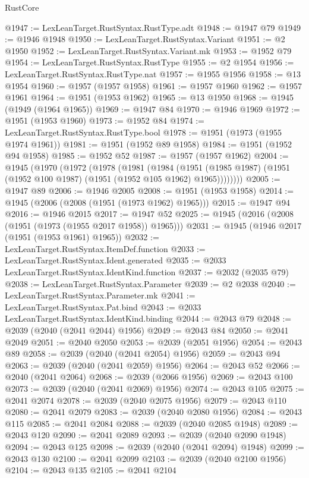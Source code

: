 \begin{lexlean}{RustCore}
\begin{coremodule}
@1947 := LexLeanTarget.RustSyntax.RustType.adt
@1948 := @1947 @79
@1949 := @1946 @1948
@1950 := LexLeanTarget.RustSyntax.Variant
@1951 := @2 @1950
@1952 := LexLeanTarget.RustSyntax.Variant.mk
@1953 := @1952 @79
@1954 := LexLeanTarget.RustSyntax.RustType
@1955 := @2 @1954
@1956 := LexLeanTarget.RustSyntax.RustType.nat
@1957 := @1955 @1956
@1958 := @13 @1954
@1960 := @1957 (@1957 @1958)
@1961 := @1957 @1960
@1962 := @1957 @1961
@1964 := @1951 (@1953 @1962)
@1965 := @13 @1950
@1968 := @1945 (@1949 (@1964 @1965))
@1969 := @1947 @84
@1970 := @1946 @1969
@1972 := @1951 (@1953 @1960)
@1973 := @1952 @84
@1974 := LexLeanTarget.RustSyntax.RustType.bool
@1978 := @1951 (@1973 (@1955 @1974 @1961))
@1981 := @1951 (@1952 @89 @1958)
@1984 := @1951 (@1952 @94 @1958)
@1985 := @1952 @52
@1987 := @1957 (@1957 @1962)
@2004 := @1945
    (@1970
      (@1972
        (@1978
          (@1981
            (@1984
              (@1951 (@1985 @1987) (@1951 (@1952 @100 @1987) (@1951 (@1952 @105 @1962) @1965))))))))
@2005 := @1947 @89
@2006 := @1946 @2005
@2008 := @1951 (@1953 @1958)
@2014 := @1945 (@2006 (@2008 (@1951 (@1973 @1962) @1965)))
@2015 := @1947 @94
@2016 := @1946 @2015
@2017 := @1947 @52
@2025 := @1945 (@2016 (@2008 (@1951 (@1973 (@1955 @2017 @1958)) @1965)))
@2031 := @1945 (@1946 @2017 (@1951 (@1953 @1961) @1965))
@2032 := LexLeanTarget.RustSyntax.ItemDef.function
@2033 := LexLeanTarget.RustSyntax.Ident.generated
@2035 := @2033 LexLeanTarget.RustSyntax.IdentKind.function
@2037 := @2032 (@2035 @79)
@2038 := LexLeanTarget.RustSyntax.Parameter
@2039 := @2 @2038
@2040 := LexLeanTarget.RustSyntax.Parameter.mk
@2041 := LexLeanTarget.RustSyntax.Pat.bind
@2043 := @2033 LexLeanTarget.RustSyntax.IdentKind.binding
@2044 := @2043 @79
@2048 := @2039 (@2040 (@2041 @2044) @1956)
@2049 := @2043 @84
@2050 := @2041 @2049
@2051 := @2040 @2050
@2053 := @2039 (@2051 @1956)
@2054 := @2043 @89
@2058 := @2039 (@2040 (@2041 @2054) @1956)
@2059 := @2043 @94
@2063 := @2039 (@2040 (@2041 @2059) @1956)
@2064 := @2043 @52
@2066 := @2040 (@2041 @2064)
@2068 := @2039 (@2066 @1956)
@2069 := @2043 @100
@2073 := @2039 (@2040 (@2041 @2069) @1956)
@2074 := @2043 @105
@2075 := @2041 @2074
@2078 := @2039 (@2040 @2075 @1956)
@2079 := @2043 @110
@2080 := @2041 @2079
@2083 := @2039 (@2040 @2080 @1956)
@2084 := @2043 @115
@2085 := @2041 @2084
@2088 := @2039 (@2040 @2085 @1948)
@2089 := @2043 @120
@2090 := @2041 @2089
@2093 := @2039 (@2040 @2090 @1948)
@2094 := @2043 @125
@2098 := @2039 (@2040 (@2041 @2094) @1948)
@2099 := @2043 @130
@2100 := @2041 @2099
@2103 := @2039 (@2040 @2100 @1956)
@2104 := @2043 @135
@2105 := @2041 @2104

\end{coremodule}
\end{lexlean}
